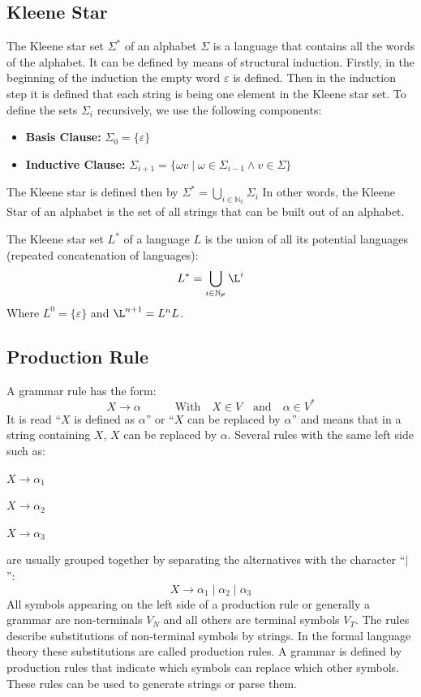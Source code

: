 \subsection{Kleene Star}
The Kleene star set $\Sigma^*$ of an alphabet $\Sigma$ is a language that contains all the words of the alphabet. It can be defined by means of structural induction. 
Firstly, in the beginning of the induction the empty word $\varepsilon$ is defined. Then in the induction step it is defined that each string is being one element in the Kleene star set.
To define the sets $\Sigma_i$ recursively, we use the following components:
\begin{itemize}
\item \textbf{Basis Clause: }$\Sigma_0 = \{\varepsilon\}$ 
\item \textbf{Inductive Clause: }$\Sigma_{i+1} = \{\omega v \mid \omega\in\Sigma_{i-1}\wedge v\in\Sigma\}$
\end{itemize}
The Kleene star is defined then by $\Sigma^* = \bigcup\limits_{i\in\mathbb{N_0}} \Sigma_{i}$
In other words, the Kleene Star of an alphabet is the set of all strings that can be built out of an alphabet.

The Kleene star set $L^*$ of a language $L$ is the union of all its potential languages (repeated concatenation of languages):
$$L^* = \bigcup\limits_{i\in\mathbb{N_0}} \L^{i}$$
Where $L^0 = \{\varepsilon\}$ and $\L^{n+1} = L^nL$. 

\subsection{Production Rule}
A grammar rule has the form:
$$X \rightarrow \alpha \qquad \quad \textrm{With} \quad X \in V \quad \textrm{and} \quad \alpha \in V^*$$
It is read ``$X$ is defined as $\alpha$'' or ``$X$ can be replaced by $\alpha$'' and means that in a string containing $X$, $X$ can be replaced by $\alpha$. Several rules with the same left side such as:

$X \rightarrow \alpha_1$

$X \rightarrow \alpha_2$

$X \rightarrow \alpha_3$

are usually grouped together by separating the alternatives with the character ``$\mid$'':
$$X \rightarrow \alpha_1 \mid \alpha_2 \mid \alpha_3$$
All symbols appearing on the left side of a production rule or generally a grammar are non-terminals $V_N$ and all others are terminal symbols $V_T$. The rules describe substitutions of non-terminal symbols by strings. In the formal language theory these substitutions are called production rules. A grammar is defined by production rules that indicate which symbols can replace which other symbols. These rules can be used to generate strings or parse them.

